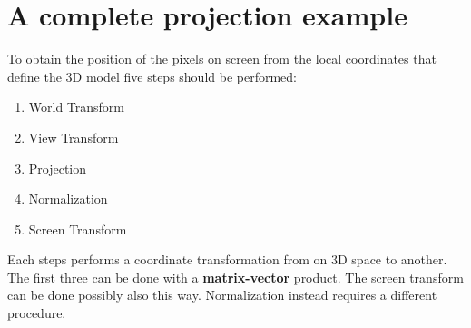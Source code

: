 \newpage
\section{A complete projection example}
To obtain the position of the pixels on screen from the local coordinates that define the 3D model five steps should be performed:
\begin{enumerate}
\item World Transform
\item View Transform
\item Projection
\item Normalization
\item Screen Transform
\end{enumerate}
Each steps performs a coordinate transformation from on 3D space to another.
The first three can be done with a \textbf{matrix-vector} product.
The screen transform can be done possibly also this way. Normalization instead requires a different procedure.

